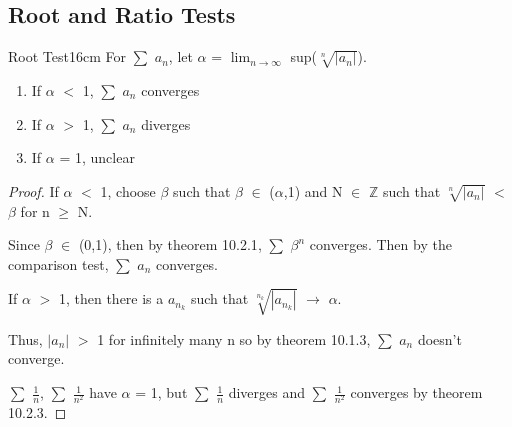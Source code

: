     \vspace{0.3cm}





\subsection{ Root and Ratio Tests }

    \begin{wtheorem}{Root Test}{16cm}
        For $\sum$ $a_n$, let
        $\alpha$ = $\lim_{n \rightarrow \infty}$ sup($\sqrt[n]{|a_n|}$).
    \end{wtheorem}

    \begin{enumerate}[label=(\alph*), leftmargin=2cm, itemsep=0.1cm]
        \item If $\alpha$ $<$ 1, $\sum$ $a_n$ converges
        
        \item If $\alpha$ $>$ 1, $\sum$ $a_n$ diverges
        
        \item If $\alpha$ = 1, unclear
    \end{enumerate}

    \begin{proof}
        If $\alpha$ $<$ 1, choose $\beta$ such that $\beta$ $\in$ ($\alpha$,1)
        and N $\in$ $\mathbb{Z}$ such that $\sqrt[n]{|a_n|}$ $<$ $\beta$ for
        n $\geq$ N.

        Since $\beta$ $\in$ (0,1), then by {\color{red} theorem 10.2.1},
        $\sum$ $\beta^n$ converges.
        Then by the {\color{red} comparison test}, $\sum$ $a_n$ converges.

        \vspace{0.2cm}

        If $\alpha$ $>$ 1, then there is a $a_{n_k}$ such that
        $\sqrt[n_k]{|a_{n_k}|}$ $\rightarrow$ $\alpha$.

        Thus, $|a_n|$ $>$ 1 for infinitely many n so 
        by {\color{red} theorem 10.1.3}, $\sum$ $a_n$ doesn't converge.

        \vspace{0.2cm}

        $\sum$ $\frac{1}{n}$, $\sum$ $\frac{1}{n^2}$
        have $\alpha$ = 1, but $\sum$ $\frac{1}{n}$ diverges and
        $\sum$ $\frac{1}{n^2}$ converges by {\color{red} theorem 10.2.3}.
    \end{proof}

